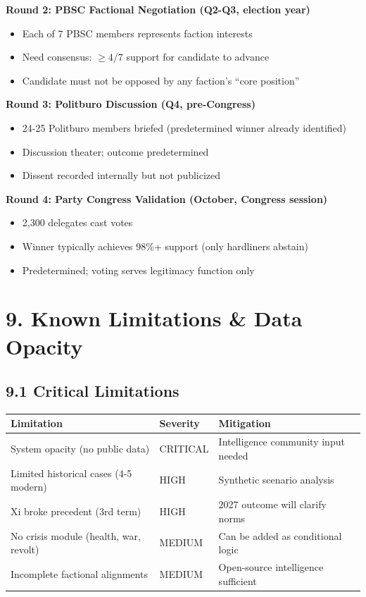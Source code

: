 \documentclass[11pt]{article}
\begin{document}
\textbf{Round 2: PBSC Factional Negotiation (Q2-Q3, election year)}
\begin{itemize}
\item Each of 7 PBSC members represents faction interests
\item Need consensus: $\geq 4/7$ support for candidate to advance
\item Candidate must not be opposed by any faction's ``core position''
\end{itemize}

\textbf{Round 3: Politburo Discussion (Q4, pre-Congress)}
\begin{itemize}
\item 24-25 Politburo members briefed (predetermined winner already identified)
\item Discussion theater; outcome predetermined
\item Dissent recorded internally but not publicized
\end{itemize}

\textbf{Round 4: Party Congress Validation (October, Congress session)}
\begin{itemize}
\item 2,300 delegates cast votes
\item Winner typically achieves 98\%+ support (only hardliners abstain)
\item Predetermined; voting serves legitimacy function only
\end{itemize}

\section{9. Known Limitations \& Data Opacity}

\subsection{9.1 Critical Limitations}

\begin{table}[h]
\centering
\begin{tabular}{|l|l|l|}
\hline
\textbf{Limitation} & \textbf{Severity} & \textbf{Mitigation} \\
\hline
System opacity (no public data) & CRITICAL & Intelligence community input needed \\
Limited historical cases (4-5 modern) & HIGH & Synthetic scenario analysis \\
Xi broke precedent (3rd term) & HIGH & 2027 outcome will clarify norms \\
No crisis module (health, war, revolt) & MEDIUM & Can be added as conditional logic \\
Incomplete factional alignments & MEDIUM & Open-source intelligence sufficient \\
\hline
\end{tabular}
\end{table}
\end{document}
